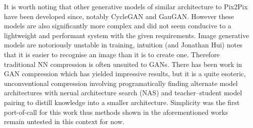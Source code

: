\documentclass{article}
\begin{document}
It is worth noting that other generative models of similar architecture to Pix2Pix have been developed since, notably CycleGAN\cite{1703.10593} and GauGAN\cite{1903.07291}. However these models are also significantly more complex and did not seem conducive to a lightweight and performant system with the given requirements. Image generative models are notoriously unstable in training, intuition (and Jonathan Hui) notes that it is easier to recognise an image than it is to create one\cite{hard_to_train_gans}. Therefore traditional NN compression\cite{2006.03669} is often unsuited to GANs. There has been work in GAN compression which has yielded impressive results, but it is a quite esoteric, unconventional compression involving programatically finding alternate model architectures with nerual architecture search (NAS) and teacher--student model pairing to distill knowledge into a smaller architecture\cite{2003.08936}. Simplicity was the first port-of-call for this work thus methods shown in the aforementioned works remain untested in this context for now.
\end{document}
